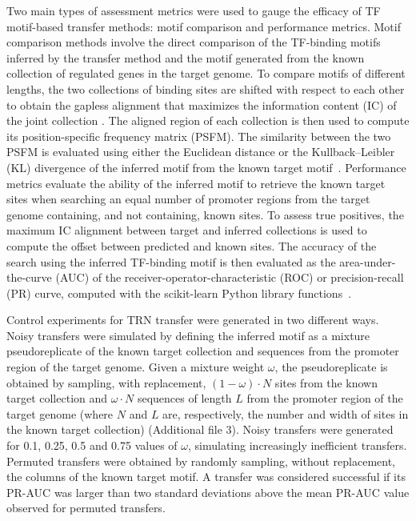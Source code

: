 Two main types of assessment metrics were used to gauge the efficacy of TF
motif-based transfer methods: motif comparison and performance metrics. Motif
comparison methods involve the direct comparison of the TF-binding motifs
inferred by the transfer method and the motif generated from the known
collection of regulated genes in the target genome. To compare motifs of
different lengths, the two collections of binding sites are shifted with
respect to each other to obtain the gapless alignment that maximizes the
information content (IC) of the joint collection
\cite{schneider1986information}. The aligned region of each collection is then
used to compute its position-specific frequency matrix (PSFM). The similarity
between the two PSFM is evaluated using either the Euclidean distance or the
Kullback–Leibler (KL) divergence of the inferred motif from the known target
motif~\cite{gupta2007quantifying}. Performance metrics evaluate the ability of
the inferred motif to retrieve the known target sites when searching an equal
number of promoter regions from the target genome containing, and not
containing, known sites. To assess true positives, the maximum IC alignment
between target and inferred collections is used to compute the offset between
predicted and known sites. The accuracy of the search using the inferred
TF-binding motif is then evaluated as the area-under-the-curve (AUC) of the
receiver-operator-characteristic (ROC) or precision-recall (PR) curve, computed
with the scikit-learn Python library functions~\cite{lewis1991evaluating,
  zweig1993receiver, scikit-learn}.

Control experiments for TRN transfer were generated in two different
ways. Noisy transfers were simulated by defining the inferred motif as a
mixture pseudoreplicate of the known target collection and sequences from the
promoter region of the target genome. Given a mixture weight $\omega$, the
pseudoreplicate is obtained by sampling, with replacement, $(1-\omega) \cdot N$
sites from the known target collection and $\omega \cdot N$ sequences of length
$L$ from the promoter region of the target genome (where $N$ and $L$ are,
respectively, the number and width of sites in the known target collection)
(Additional file 3). Noisy transfers were generated for 0.1, 0.25, 0.5 and 0.75
values of $\omega$, simulating increasingly inefficient transfers. Permuted
transfers were obtained by randomly sampling, without replacement, the columns
of the known target motif. A transfer was considered successful if its PR-AUC
was larger than two standard deviations above the mean PR-AUC value observed
for permuted transfers.

